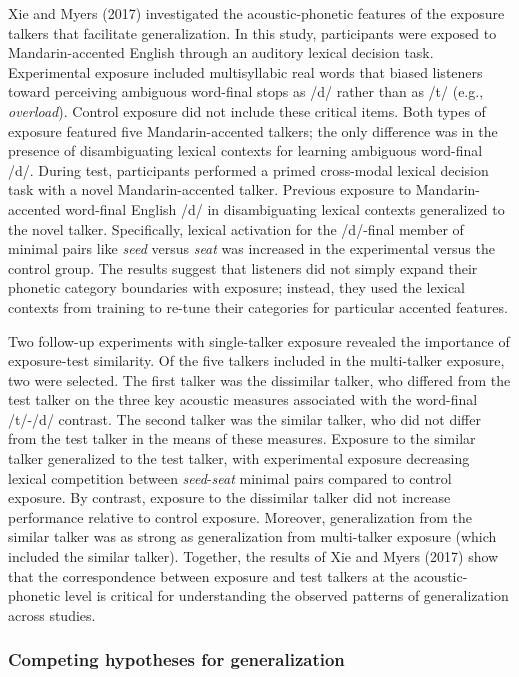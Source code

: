 \documentclass[
  preprint]{elsarticle}
\begin{document}
Xie and Myers (2017) investigated the acoustic-phonetic features of the exposure talkers that facilitate generalization.
In this study, participants were exposed to Mandarin-accented English through an auditory lexical decision task.
Experimental exposure included multisyllabic real words that biased listeners toward perceiving ambiguous word-final stops as /d/ rather than as /t/ (e.g., \emph{overload}).
Control exposure did not include these critical items.
Both types of exposure featured five Mandarin-accented talkers; the only difference was in the presence of disambiguating lexical contexts for learning ambiguous word-final /d/.
During test, participants performed a primed cross-modal lexical decision task with a novel Mandarin-accented talker.
Previous exposure to Mandarin-accented word-final English /d/ in disambiguating lexical contexts generalized to the novel talker.
Specifically, lexical activation for the /d/-final member of minimal pairs like \emph{seed} versus \emph{seat} was increased in the experimental versus the control group.
The results suggest that listeners did not simply expand their phonetic category boundaries with exposure; instead, they used the lexical contexts from training to re-tune their categories for particular accented features.

Two follow-up experiments with single-talker exposure revealed the importance of exposure-test similarity.
Of the five talkers included in the multi-talker exposure, two were selected.
The first talker was the dissimilar talker, who differed from the test talker on the three key acoustic measures associated with the word-final /t/-/d/ contrast.
The second talker was the similar talker, who did not differ from the test talker in the means of these measures.
Exposure to the similar talker generalized to the test talker, with experimental exposure decreasing lexical competition between \emph{seed}-\emph{seat} minimal pairs compared to control exposure.
By contrast, exposure to the dissimilar talker did not increase performance relative to control exposure.
Moreover, generalization from the similar talker was as strong as generalization from multi-talker exposure (which included the similar talker).
Together, the results of Xie and Myers (2017) show that the correspondence between exposure and test talkers at the acoustic-phonetic level is critical for understanding the observed patterns of generalization across studies.

\hypertarget{competing-hypotheses-for-generalization}{%
\subsubsection{Competing hypotheses for generalization}\label{competing-hypotheses-for-generalization}}
\end{document}
